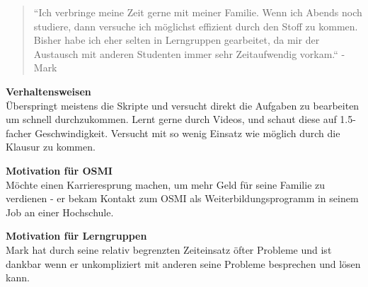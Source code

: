 \documentclass{article}
\begin{document}
\vspace{-1em}

\begin{quote}
	``Ich verbringe meine Zeit gerne mit meiner Familie. Wenn ich Abends noch studiere, dann versuche
	ich möglichst effizient durch den Stoff zu kommen. Bisher habe ich eher selten in Lerngruppen gearbeitet,
	da mir der Austausch mit anderen Studenten immer sehr Zeitaufwendig vorkam.`` - Mark
\end{quote}

\vspace{0em}

\begin{flushleft}
	\textbf{Verhaltensweisen} \\
	Überspringt meistens die Skripte und versucht direkt die Aufgaben zu bearbeiten um schnell durchzukommen.
	Lernt gerne durch Videos, und schaut diese auf 1.5-facher Geschwindigkeit. Versucht mit so wenig Einsatz
	wie möglich durch die Klausur zu kommen.\\
	\vspace{1em}

	\textbf{Motivation für OSMI} \\
	Möchte einen Karrieresprung machen, um mehr Geld für seine Familie zu verdienen - er bekam Kontakt zum
	OSMI als Weiterbildungsprogramm in seinem Job an einer Hochschule. \\

	\vspace{1em}

	\textbf{Motivation für Lerngruppen} \\
	Mark hat durch seine relativ begrenzten Zeiteinsatz öfter Probleme und ist dankbar wenn er unkompliziert mit
	anderen seine Probleme besprechen und lösen kann.
\end{flushleft}

\vspace{1em}
\end{document}
